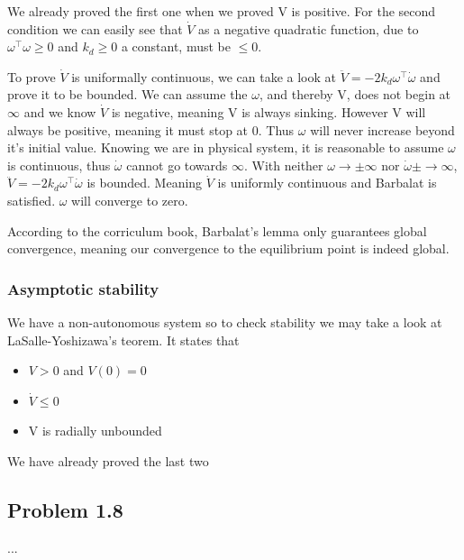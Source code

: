 We already proved the first one when we proved V is positive. For the second condition we can easily see that $\dot{V}$ as a negative quadratic function, due to $\omega^\top\omega \geq 0$ and $k_d \geq 0$ a constant, must be $\leq 0$.

To prove $\dot{V}$ is uniformally continuous, we can take a look at $\ddot{V} = -2k_d\omega^\top\dot{\omega}$ and prove it to be bounded. We can assume the $\omega$, and thereby V, does not begin at $\infty$ and we know $\dot{V}$ is negative, meaning V is always sinking. However V will always be positive, meaning it must stop at 0. Thus $\omega$ will never increase beyond it's initial value. Knowing we are in physical system, it is reasonable to assume $\omega$ is continuous, thus $\dot{\omega}$ cannot go towards $\infty$. With neither $\omega \rightarrow \pm\infty$ nor $\dot{\omega} \pm\rightarrow \infty$, $\ddot{V} = -2k_d\omega^\top\dot{\omega}$ is bounded. Meaning $\dot{V}$ is uniformly continuous and Barbalat is satisfied. $\omega$ will converge to zero. 

According to the corriculum book\cite{Fossen2011}, Barbalat's lemma only guarantees global convergence, meaning our convergence to the equilibrium point is indeed global.

\subsubsection*{Asymptotic stability}

We have a non-autonomous system so to check stability we may take a look at LaSalle-Yoshizawa's teorem. It states that

\begin{itemize}
    \item $V > 0$ and  $V(0) = 0$
    \item $\dot{V} \leq 0$
    \item V is radially unbounded
\end{itemize}

We have already proved the last two


\subsection*{Problem 1.8}
...


